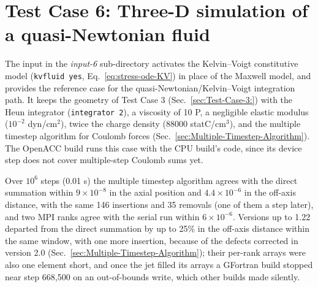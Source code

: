 \section{Test Case 6: Three-D simulation of a quasi-Newtonian fluid}

The input in the \textit{input-6} sub-directory activates the
Kelvin--Voigt constitutive model (\texttt{kvfluid yes},
Eq.~\ref{eq:stress-ode-KV}) in place of the Maxwell model, and provides the
reference case for the quasi-Newtonian/Kelvin--Voigt integration path.  It
keeps the geometry of Test Case 3 (Sec.~\ref{sec:Test-Case-3:}) with the
Heun integrator (\texttt{integrator 2}), a viscosity of 10 P, a negligible
elastic modulus ($10^{-2}$ dyn/cm$^{2}$), twice the charge density
(88000 statC/cm$^{3}$), and the multiple timestep algorithm for Coulomb
forces (Sec.~\ref{sec:Multiple-Timestep-Algorithm}).  The OpenACC build runs
this case with the CPU build's code, since its device step does not cover
multiple-step Coulomb sums yet.

Over $10^{6}$ steps (0.01 s) the multiple timestep algorithm agrees with the
direct summation within $9\times10^{-8}$ in the axial position and
$4.4\times10^{-6}$ in the off-axis distance, with the same 146 insertions
and 35 removals (one of them a step later), and two MPI ranks agree with the
serial run within $6\times10^{-6}$.  Versions up to 1.22 departed from the
direct summation by up to 25\% in the off-axis distance within the same
window, with one more insertion, because of the defects corrected in
version 2.0 (Sec.~\ref{sec:Multiple-Timestep-Algorithm}); their per-rank
arrays were also one element short, and once the jet filled its arrays a
GFortran build stopped near step 668,500 on an out-of-bounds write, which
other builds made silently.
